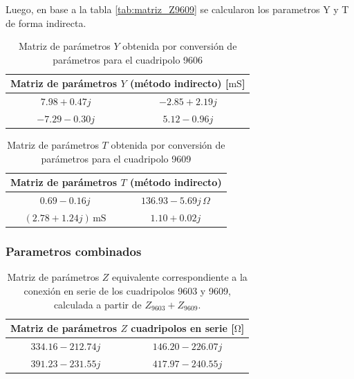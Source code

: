 Luego, en base a la tabla \ref{tab:matriz_Z9609} se calcularon los parametros Y y T de forma indirecta.
	
	\begin{table}[H]
\centering
\begin{tabular}{|c|c|}
\hline
\multicolumn{2}{|c|}{\textbf{Matriz de parámetros $Y$ (método indirecto) [$\mathrm{mS}$]}} \\ \hline
$7.98 + 0.47j\,$ & $-2.85 + 2.19j\,$ \\ \hline
$-7.29 - 0.30j\,$ & $5.12 - 0.96j\,$ \\ \hline
\end{tabular}
\caption{Matriz de parámetros $Y$ obtenida por conversión de parámetros para el cuadripolo 9606}
\label{tab:matriz_Y9606_indirecta}
\end{table}

\begin{table}[H]
\centering
\begin{tabular}{|c|c|}
\hline
\multicolumn{2}{|c|}{\textbf{Matriz de parámetros $T$ (método indirecto)}} \\ \hline
$0.69 - 0.16j$ & $136.93 - 5.69j\,\Omega$ \\ \hline
$(2.78 + 1.24j)\,\mathrm{mS}$ & $1.10 + 0.02j$ \\ \hline
\end{tabular}
\caption{Matriz de parámetros $T$ obtenida por conversión de parámetros para el cuadripolo 9609}
\label{tab:matriz_T9609_indirecta}
\end{table}

	\subsubsection{Parametros combinados}
	
\begin{table}[H]
\centering
\begin{tabular}{|c|c|}
\hline
\multicolumn{2}{|c|}{\textbf{Matriz de parámetros $Z$ cuadripolos en serie [$\mathrm{\Omega}$]}} \\ \hline
$334.16 - 212.74j\,$ & $146.20 - 226.07j\,$ \\ \hline
$391.23 - 231.55j\,$ & $417.97 - 240.55j\,$ \\ \hline
\end{tabular}
\caption{Matriz de parámetros $Z$ equivalente correspondiente a la conexión en serie de los cuadripolos 9603 y 9609, calculada a partir de $Z_{9603} + Z_{9609}$.}
\label{tab:matriz_Z_serie_9603_9609}
\end{table}

